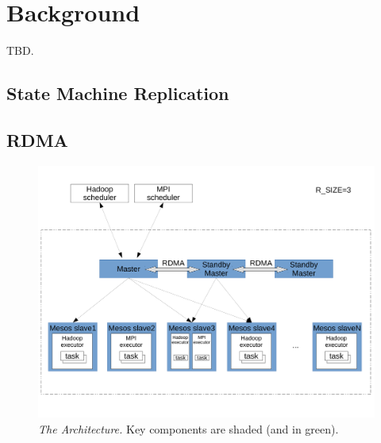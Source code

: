 \section{Background} \label{sec:background}

TBD.

\subsection{State Machine Replication} \label{sec:smr}

\subsection{RDMA} \label{sec:rdma}

% 
% 
% 
\begin{figure}[t]
\vspace{.20in}
\centering
\includegraphics[width=.47\textwidth]{figures/arch}
\vspace{.06in}
\caption{{\em The \xxx Architecture.} Key components are shaded (and 
in green).} \label{fig:repbox}
\vspace{-.05in}
\end{figure}


